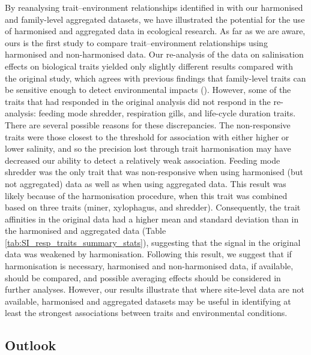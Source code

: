 \documentclass{article}
\begin{document}
By reanalysing trait–environment relationships identified in \citet{szocs_effects_2014} with our harmonised and family-level aggregated datasets, we have illustrated the potential for the use of harmonised and aggregated data in ecological research. As far as we are aware, ours is the first study to compare trait–environment relationships using harmonised and non-harmonised data.
Our re-analysis of the data on salinisation effects on biological traits yielded only slightly different results compared with the original study, which agrees with previous findings that family-level traits can be sensitive enough to detect environmental impacts (\cite{beketov_spear_2009}). However, some of the traits that had responded in the original analysis did not respond in the re-analysis: feeding mode shredder, respiration gills, and life-cycle duration traits. There are several possible reasons for these discrepancies. The non-responsive traits were those closest to the threshold for association with either higher or lower salinity, and so the precision lost through trait harmonisation may have decreased our ability to detect a relatively weak association. Feeding mode shredder was the only trait that was non-responsive when using harmonised (but not aggregated) data as well as when using aggregated data. This result was likely because of the harmonisation procedure, when this trait was combined based on three traits (miner, xylophagus, and shredder). Consequently, the trait affinities in the original data had a higher mean and standard deviation than in the harmonised and aggregated data (Table \ref{tab:SI_resp_traits_summary_stats}), suggesting that the signal in the original data was weakened by harmonisation. Following this result, we suggest that if harmonisation is necessary, harmonised and non-harmonised data, if available, should be compared, and possible averaging effects should be considered in further analyses. However, our results illustrate that where site-level data are not available, harmonised and aggregated datasets may be useful in identifying at least the strongest associations between traits and environmental conditions. 


\subsection*{Outlook}
\end{document}
